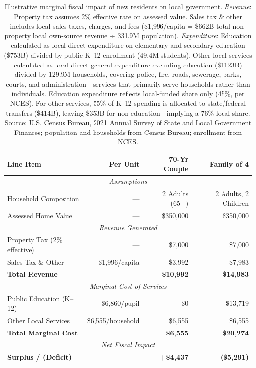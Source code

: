 \begin{table}[htbp!]
    \centering
    \small
    \begin{tabular}{|l|r|r|r|}
    \hline
    \textbf{Line Item} & \textbf{Per Unit} & \textbf{70-Yr Couple} & \textbf{Family of 4} \\ \hline
    \multicolumn{4}{|c|}{\textit{Assumptions}} \\ \hline
    Household Composition & --- & 2 Adults (65+) & 2 Adults, 2 Children \\ \hline
    Assessed Home Value & --- & \$350,000 & \$350,000 \\ \hline
    \multicolumn{4}{|c|}{\textit{Revenue Generated}} \\ \hline
    Property Tax (2\% effective) & --- & \$7,000 & \$7,000 \\ \hline
    Sales Tax \& Other & \$1,996/capita & \$3,992 & \$7,983 \\ \hline
    \textbf{Total Revenue} & --- & \textbf{\$10,992} & \textbf{\$14,983} \\ \hline
    \multicolumn{4}{|c|}{\textit{Marginal Cost of Services}} \\ \hline
    Public Education (K--12) & \$6,860/pupil & \$0 & \$13,719 \\ \hline
    Other Local Services & \$6,555/household & \$6,555 & \$6,555 \\ \hline
    \textbf{Total Marginal Cost} & --- & \textbf{\$6,555} & \textbf{\$20,274} \\ \hline
    \multicolumn{4}{|c|}{\textit{Net Fiscal Impact}} \\ \hline
    \textbf{Surplus / (Deficit)} & --- & \textbf{+\$4,437} & \textbf{(\$5,291)} \\ \hline
    \end{tabular}
    \caption{Illustrative marginal fiscal impact of new residents on local government. \textit{Revenue}: Property tax assumes 2\% effective rate on assessed value. Sales tax \& other includes local sales taxes, charges, and fees (\$1,996/capita = \$662B total non-property local own-source revenue $\div$ 331.9M population). \textit{Expenditure}: Education calculated as local direct expenditure on elementary and secondary education (\$753B) divided by public K--12 enrollment (49.4M students). Other local services calculated as local direct general expenditure excluding education (\$1123B) divided by 129.9M households, covering police, fire, roads, sewerage, parks, courts, and administration---services that primarily serve households rather than individuals. Education expenditure reflects local-funded share only (45\%, per NCES). For other services, 55\% of K--12 spending is allocated to state/federal transfers (\$414B), leaving \$353B for non-education---implying a 76\% local share. Source: U.S. Census Bureau, 2021 Annual Survey of State and Local Government Finances; population and households from Census Bureau; enrollment from NCES.}
    \label{tab:fiscal_impact}
\end{table}